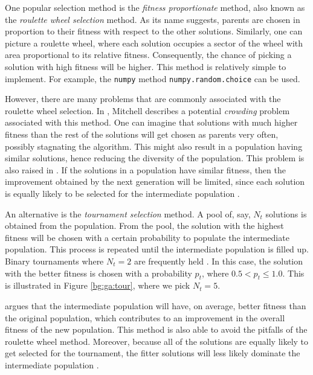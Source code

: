 \documentclass[12pt, twoside, a4paper]{report}
\begin{document}
One popular selection method is the \textit{fitness proportionate} method, also known as the \textit{roulette wheel selection} method. As its name suggests, parents are chosen in proportion to their fitness with respect to the other solutions. Similarly, one can picture a roulette wheel, where each solution occupies a sector of the wheel with area proportional to its relative fitness. Consequently, the chance of picking a solution with high fitness will be higher. This method is relatively simple to implement. For example, the \texttt{numpy} \cite{RefWorks:214} method \texttt{numpy.random.choice} can be used. 

However, there are many problems that are commonly associated with the roulette wheel selection. In \cite{RefWorks:205}, Mitchell describes a potential \textit{crowding} problem associated with this method. One can imagine that solutions with much higher fitness than the rest of the solutions will get chosen as parents very often, possibly stagnating the algorithm. This might also result in a population having similar solutions, hence reducing the diversity of the population. This problem is also raised in \cite{RefWorks:239}. If the solutions in a population have similar fitness, then the improvement obtained by the next generation will be limited, since each solution is equally likely to be selected for the intermediate population \cite{RefWorks:245}.

An alternative is the \textit{tournament selection} method. A pool of, say, $N_t$ solutions is obtained from the population. From the pool, the solution with the highest fitness will be chosen with a certain probability to populate the intermediate population. This process is repeated until the intermediate population is filled up.  Binary tournaments where $N_t=2$ are frequently held \cite{RefWorks:242, RefWorks:243}. In this case, the solution with the better fitness is chosen with a probability $p_t$, where $0.5 < p_t \leq 1.0$. This is illustrated in Figure \ref{bg:ga:tour}, where we pick $N_t=5$.

\cite{RefWorks:242} argues that the intermediate population will have, on average, better fitness than the original population, which contributes to an improvement in the overall fitness of the new population. This method is also able to avoid the pitfalls of the roulette wheel method. Moreover, because all of the solutions are equally likely to get selected for the tournament, the fitter solutions will less likely dominate the intermediate population \cite{RefWorks:245}.
\end{document}
